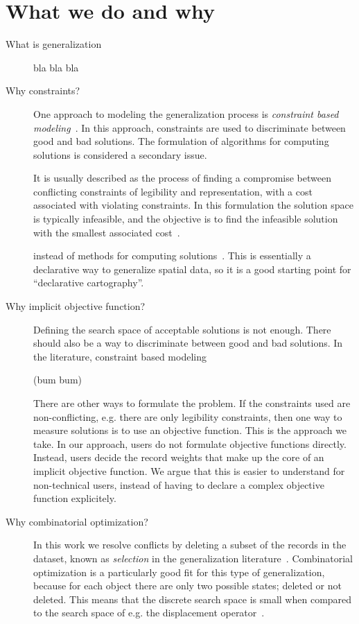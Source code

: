 \documentclass[11pt, oneside]{article}   	%
\begin{document}
\section{What we do and why}

\begin{description}


\item[What is generalization] bla bla bla

\item[Why constraints?] One approach to modeling the generalization process is \emph{constraint based modeling}~\cite{harrie1999constraint}. In this approach, constraints are used to discriminate between good and bad solutions. The formulation of algorithms for computing solutions is considered a secondary issue. 

It is usually described as the process of finding a compromise between conflicting constraints of legibility and representation, with a cost associated with violating constraints. In this formulation the solution space is typically infeasible, and the objective is to find the infeasible solution with the smallest associated cost~\cite{harrie2007modelling}.


instead of methods for computing solutions~\cite{beard1991constraints}. This is essentially a declarative way to generalize spatial data, so it is a good starting point for ``declarative cartography''.

\item[Why implicit objective function?] Defining the search space of acceptable solutions is not enough. There should also be a way to discriminate between good and bad solutions. In the literature, constraint based modeling 

(bum bum)

There are other ways to formulate the problem. If the constraints used are non-conflicting, e.g. there are only legibility constraints, then one way to measure solutions is to use an objective function. This is the approach we take. In our approach, users do not formulate objective functions directly. Instead, users decide the record weights that make up the core of an implicit objective function. We argue that this is easier to understand for non-technical users, instead of having to declare a complex objective function explicitely.

\item[Why combinatorial optimization?] In this work we resolve conflicts by deleting a subset of the records in the dataset, known as \emph{selection} in the generalization literature~\cite{weibel1999generalising}. Combinatorial optimization is a particularly good fit for this type of generalization, because for each object there are only two possible states; deleted or not deleted. This means that the discrete search space is small when compared to the search space of e.g. the displacement operator~\cite{harrie2007modelling}.


\end{description}
\end{document}
